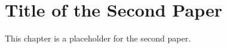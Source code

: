 \chapter{Title of the Second Paper}\label{chap:paper-two}

This chapter is a placeholder for the second paper.
